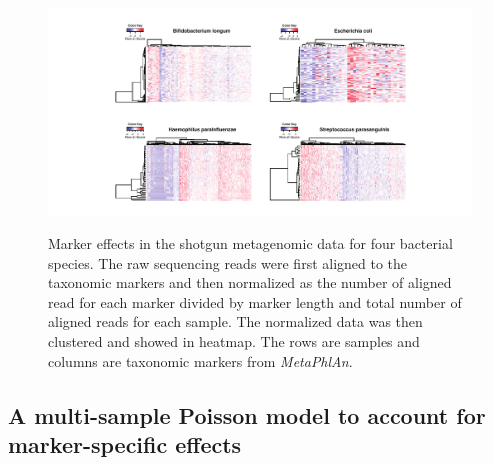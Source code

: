 \begin{figure}[htb]
	\centering
	{\includegraphics[scale=0.95,trim=80 0 0 0,clip]{Figure/F31_Marker_Effects.pdf}}
	\caption[Marker effects in the shotgun metagenomic data for four bacterial species]{Marker effects in the shotgun metagenomic data for four bacterial species. The raw sequencing reads were first aligned to the taxonomic markers and then normalized as the number of aligned read for each marker divided by marker length and total number of aligned reads for each sample. The normalized data was then clustered and showed in heatmap. The rows are  samples and columns are taxonomic markers from {\it MetaPhlAn}. }
	\label{F31_Marker_Effects}
\end{figure}



\subsection{A multi-sample Poisson model to account for marker-specific effects}


